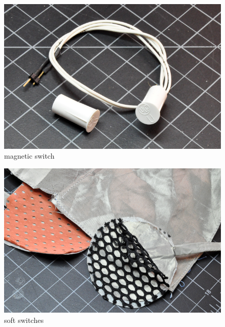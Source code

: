 \begin{figure}[!htb]
 \centering
 \includegraphics[scale=0.3]{img/switches/magnetic_switch.jpg}
 \caption{magnetic switch}
 \label{magnetic switch}
\end{figure}











\begin{figure}[!htb]
 \centering
 \includegraphics[scale=0.3]{img/switches/soft_switches.jpg}
 \caption{soft switches}
 \label{soft switches}
\end{figure}





